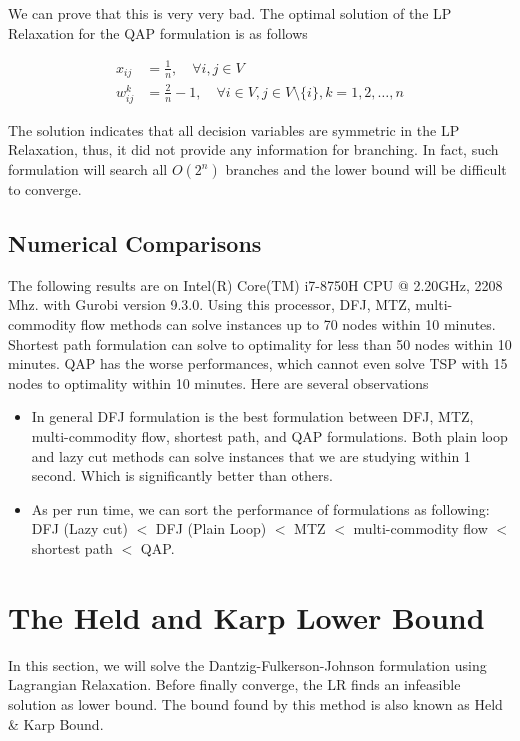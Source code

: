                 We can prove that this is very very bad. The optimal solution of the LP Relaxation for the QAP formulation is as follows

                \begin{align}
                    x_{ij} &= \frac{1}{n}, \quad \forall i, j \in V\\
                    w_{ij}^k &= \frac{2}{n} - 1, \quad \forall i \in V, j \in V \setminus \{i\}, k = 1, 2, \ldots, n
                \end{align}

                The solution indicates that all decision variables are symmetric in the LP Relaxation, thus, it did not provide any information for branching. In fact, such formulation will search all $O(2^n)$ branches and the lower bound will be difficult to converge.

            \subsection{Numerical Comparisons}
            
                The following results are on Intel(R) Core(TM) i7-8750H CPU @ 2.20GHz, 2208 Mhz. with Gurobi version 9.3.0. Using this processor, DFJ, MTZ, multi-commodity flow methods can solve instances up to 70 nodes within 10 minutes. Shortest path formulation can solve to optimality for less than 50 nodes within 10 minutes. QAP has the worse performances, which cannot even solve TSP with 15 nodes to optimality within 10 minutes. Here are several observations
                \begin{itemize}
                    \item In general DFJ formulation is the best formulation between DFJ, MTZ, multi-commodity flow, shortest path, and QAP formulations. Both plain loop and lazy cut methods can solve instances that we are studying within 1 second. Which is significantly better than others.
                    \item As per run time, we can sort the performance of formulations as following: DFJ (Lazy cut) $<$ DFJ (Plain Loop) $<$ MTZ $<$ multi-commodity flow $<$ shortest path $<$ QAP.
                \end{itemize}
        
        \section{The Held and Karp Lower Bound}
            In this section, we will solve the Dantzig-Fulkerson-Johnson formulation using Lagrangian Relaxation. Before finally converge, the LR finds an infeasible solution as lower bound. The bound found by this method is also known as Held \& Karp Bound.
            
